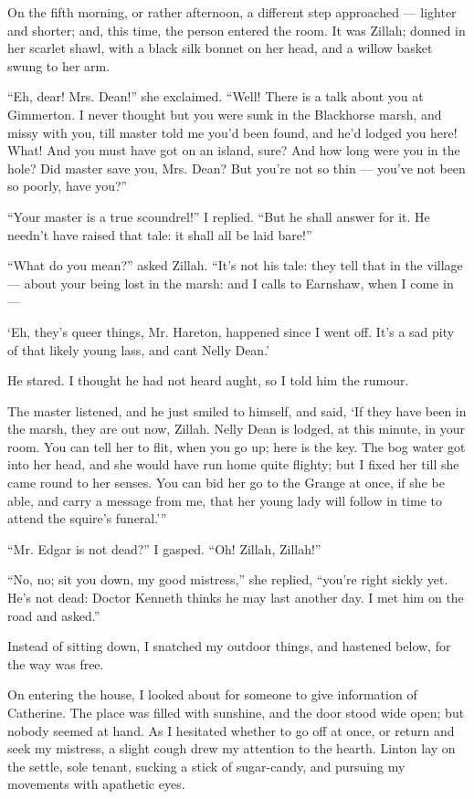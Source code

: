 \par On the fifth morning, or rather afternoon, a different step approached — lighter and shorter; and, this time, the person entered the room. It was Zillah; donned in her scarlet shawl, with a black silk bonnet on her head, and a willow basket swung to her arm.
\par “Eh, dear! Mrs. Dean!” she exclaimed. “Well! There is a talk about you at Gimmerton. I never thought but you were sunk in the Blackhorse marsh, and missy with you, till master told me you'd been found, and he'd lodged you here! What! And you must have got on an island, sure? And how long were you in the hole? Did master save you, Mrs. Dean? But you're not so thin — you've not been so poorly, have you?”
\par “Your master is a true scoundrel!” I replied. “But he shall answer for it. He needn't have raised that tale: it shall all be laid bare!”
\par “What do you mean?” asked Zillah. “It's not his tale: they tell that in the village — about your being lost in the marsh: and I calls to Earnshaw, when I come in —
\par ‘Eh, they's queer things, Mr. Hareton, happened since I went off. It's a sad pity of that likely young lass, and cant Nelly Dean.’
\par He stared. I thought he had not heard aught, so I told him the rumour.
\par The master listened, and he just smiled to himself, and said, ‘If they have been in the marsh, they are out now, Zillah. Nelly Dean is lodged, at this minute, in your room. You can tell her to flit, when you go up; here is the key. The bog water got into her head, and she would have run home quite flighty; but I fixed her till she came round to her senses. You can bid her go to the Grange at once, if she be able, and carry a message from me, that her young lady will follow in time to attend the squire's funeral.’”
\par “Mr. Edgar is not dead?” I gasped. “Oh! Zillah, Zillah!”
\par “No, no; sit you down, my good mistress,” she replied, “you're right sickly yet. He's not dead: Doctor Kenneth thinks he may last another day. I met him on the road and asked.”
\par Instead of sitting down, I snatched my outdoor things, and hastened below, for the way was free.
\par On entering the house, I looked about for someone to give information of Catherine. The place was filled with sunshine, and the door stood wide open; but nobody seemed at hand. As I hesitated whether to go off at once, or return and seek my mistress, a slight cough drew my attention to the hearth. Linton lay on the settle, sole tenant, sucking a stick of sugar-candy, and pursuing my movements with apathetic eyes.
